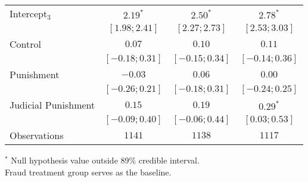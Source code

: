 \begin{table}[h]
\begin{center}
\begin{threeparttable}
\begin{tabular}{l c c c}
Intercept$_3$       & $2.19^{*}$        & $2.50^{*}$        & $2.78^{*}$        \\
                    & $ [ 1.98;  2.41]$ & $ [ 2.27;  2.73]$ & $ [ 2.53;  3.03]$ \\
Control             & $0.07$            & $0.10$            & $0.11$            \\
                    & $ [-0.18;  0.31]$ & $ [-0.15;  0.34]$ & $ [-0.14;  0.36]$ \\
Punishment          & $-0.03$           & $0.06$            & $0.00$            \\
                    & $ [-0.26;  0.21]$ & $ [-0.18;  0.31]$ & $ [-0.24;  0.25]$ \\
Judicial Punishment & $0.15$            & $0.19$            & $0.29^{*}$        \\
                    & $ [-0.09;  0.40]$ & $ [-0.06;  0.44]$ & $ [ 0.03;  0.53]$ \\
\hline
Observations        & $1141$            & $1138$            & $1117$            \\
\hline
\end{tabular}
\begin{tablenotes}[flushleft]
\scriptsize{$^*$ Null hypothesis value outside 89\% credible interval.  \\
Fraud treatment group serves as the baseline.}
\end{tablenotes}
\end{threeparttable}
\label{table:coefficients}
\end{center}
\end{table}
